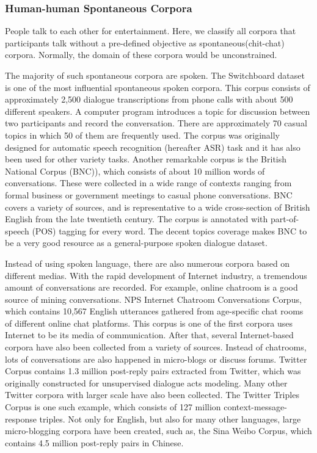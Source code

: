 \documentclass[bsc,frontabs,twoside,singlespacing,parskip,deptreport]{infthesis}     %
\begin{document}
\subsubsection{Human-human Spontaneous Corpora}

People talk to each other for entertainment. Here, we classify all corpora that participants talk without a pre-defined objective as spontaneous(chit-chat) corpora. Normally, the domain of these corpora would be unconstrained.

The majority of such spontaneous corpora are spoken. The Switchboard dataset\cite{godfrey1992switchboard} is one of the most influential spontaneous spoken corpora. This corpus consists of approximately 2,500 dialogue transcriptions from phone calls with about 500 different speakers. A computer program introduces a topic for discussion between two participants and record the conversation. There are approximately 70 casual topics in which 50 of them are frequently used. The corpus was originally designed for automatic speech recognition (hereafter ASR) task and it has also been used for other variety tasks. Another remarkable corpus is the British National Corpus (BNC)\cite{leech1992100}), which consists of about 10 million words of conversations. These were collected in a wide range of contexts ranging from formal business or government meetings to casual phone conversations. BNC covers a variety of sources, and is representative to a wide cross-section of British English from the late twentieth century. The corpus is annotated with part-of-speech (POS) tagging for every word. The decent topics coverage makes BNC to be a very good resource as a general-purpose spoken dialogue dataset.

Instead of using spoken language, there are also numerous corpora based on different medias. With the rapid development of Internet industry, a tremendous amount of conversations are recorded. For example, online chatroom is a good source of mining conversations. NPS Internet Chatroom Conversations Corpus\cite{forsythand2007lexical}, which contains 10,567 English utterances gathered from age-specific chat rooms of different online chat platforms. This corpus is one of the first corpora uses Internet to be its media of communication. After that, several Internet-based corpora have also been collected from a variety of sources. Instead of chatrooms, lots of conversations are also happened in micro-blogs or discuss forums. Twitter Corpus\cite{ritter2010unsupervised} contains 1.3 million post-reply pairs extracted from Twitter, which was originally constructed for unsupervised dialogue acts modeling. Many other Twitter corpora with larger scale have also been collected. The Twitter Triples Corpus\cite{sordoni2015neural} is one such example, which consists of 127 million context-message-response triples. Not only for English, but also for many other languages, large micro-blogging corpora have been created, such as, the Sina Weibo Corpus\cite{shang2015neural}, which contains 4.5 million post-reply pairs in Chinese.
\end{document}
